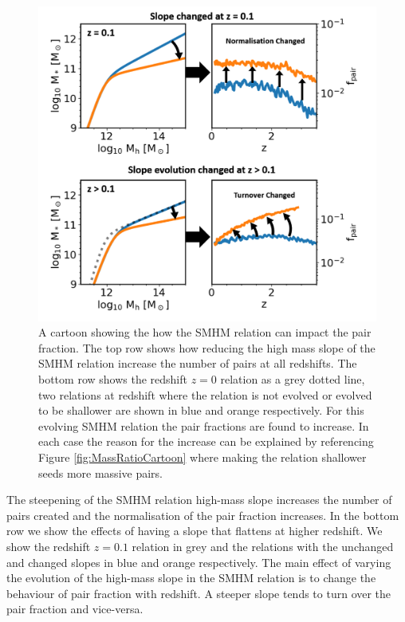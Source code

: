 \begin{figure}[h]
	\centering
	\includegraphics[width = \linewidth]{Figures/Chapter5/SMHM_PF_Cartoon.png}
	\caption{A cartoon showing the how the SMHM relation can impact the pair fraction. The top row shows how reducing the high mass slope of the SMHM relation increase the number of pairs at all redshifts. The bottom row shows the redshift $z=0$ relation as a grey dotted line, two relations at redshift where the relation is not evolved or evolved to be shallower are shown in blue and orange respectively. For this evolving SMHM relation the pair fractions are found to increase. In each case the reason for the increase can be explained by referencing Figure \ref{fig:MassRatioCartoon} where making the relation shallower seeds more massive pairs.}
	\label{fig:SMHM_PF_Cartoon}
\end{figure}

The steepening of the SMHM relation high-mass slope increases the number of pairs created and the normalisation of the pair fraction increases. 
In the bottom row we show the effects of having a slope that flattens at higher redshift. 
We show the redshift $z=0.1$ relation in grey and the relations with the unchanged and changed slopes in blue and orange respectively. 
The main effect of varying the evolution of the high-mass slope in the SMHM relation is to change the behaviour of pair fraction with redshift. 
A steeper slope tends to turn over the pair fraction and vice-versa.


